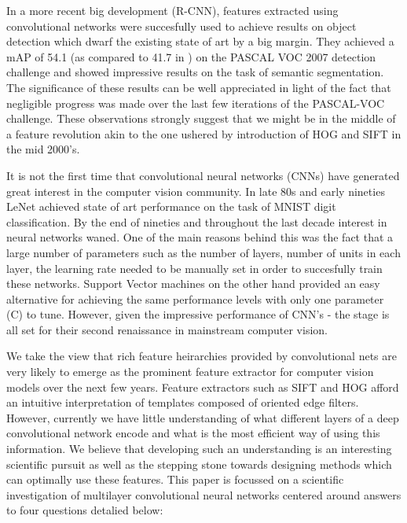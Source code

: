 \documentclass[runningheads]{llncs}
\begin{document}
In a more recent big development (R-CNN)\cite{Rcnn}, features extracted using convolutional networks were succesfully used to achieve results on object detection which dwarf the existing state of art by a big margin. They achieved a mAP of 54.1 (as compared to 41.7 in  \cite{regionlets}) on the PASCAL VOC 2007 detection challenge and showed impressive results on the task of semantic segmentation. The significance of these results can be well appreciated in light of the fact that negligible progress was made over the last few iterations of the PASCAL-VOC challenge. These observations strongly suggest that we might be in the middle of a feature revolution akin to the one ushered by introduction of HOG \cite{Hog} and SIFT \cite{Sift} in the mid 2000's.  

It is not the first time that convolutional neural networks (CNNs) have generated great interest in the computer vision community. In late 80s and early nineties LeNet \cite{Lecun89} achieved state of art performance on the task of MNIST digit classification. By the end of nineties and throughout the last decade interest in neural networks waned. One of the main reasons behind this was the fact that a large number of parameters such as the number of layers, number of units in each layer, the learning rate needed to be manually set in order to succesfully train these networks. Support Vector machines on the other hand provided an easy alternative for achieving the same performance levels with only one parameter (C) to tune. However, given the impressive performance of CNN's - the stage is all set for their second renaissance in mainstream computer vision. 

We take the view that rich feature heirarchies provided by convolutional nets  are very likely to emerge as the prominent feature extractor for computer vision models over the next few years. Feature extractors such as SIFT and HOG afford an intuitive interpretation of templates composed of oriented edge filters. However, currently we have little understanding of what different layers of a deep convolutional network encode and what is the most efficient way of using this information. We believe that developing such an understanding is an interesting scientific pursuit as well as  the stepping stone towards designing methods which can optimally use these features.  
This paper is focussed on a scientific investigation of multilayer convolutional neural networks centered around answers to four questions detalied below:
\end{document}
